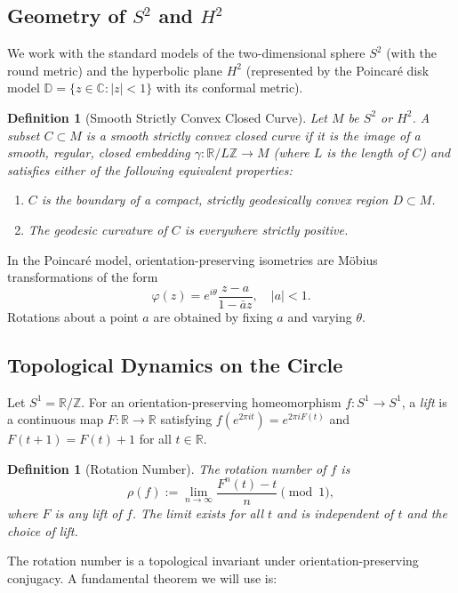 \documentclass{article}
\newtheorem{definition}[theorem]{Definition}
\begin{document}
\subsection{Geometry of $S^2$ and $H^2$}

We work with the standard models of the two-dimensional sphere $S^2$ (with the round metric) and the hyperbolic plane $H^2$ (represented by the Poincaré disk model $\mathbb{D} = \{z \in \mathbb{C}: |z| < 1\}$ with its conformal metric).

\begin{definition}[Smooth Strictly Convex Closed Curve]
    Let $M$ be $S^2$ or $H^2$. A subset $C \subset M$ is a \emph{smooth strictly convex closed curve} if it is the image of a smooth, regular, closed embedding $\gamma: \mathbb{R}/L\mathbb{Z} \to M$ (where $L$ is the length of $C$) and satisfies either of the following equivalent properties:
    \begin{enumerate}
        \item $C$ is the boundary of a compact, strictly geodesically convex region $D \subset M$.
        \item The geodesic curvature of $C$ is everywhere strictly positive.
    \end{enumerate}
\end{definition}
In the Poincaré model, orientation-preserving isometries are Möbius transformations of the form
\[
\varphi(z) = e^{i\theta} \frac{z - a}{1 - \bar{a}z}, \quad |a| < 1.
\]
Rotations about a point $a$ are obtained by fixing $a$ and varying $\theta$.

\subsection{Topological Dynamics on the Circle}

Let $S^1 = \mathbb{R}/\mathbb{Z}$. For an orientation-preserving homeomorphism $f: S^1 \to S^1$, a \emph{lift} is a continuous map $F: \mathbb{R} \to \mathbb{R}$ satisfying $f(e^{2\pi i t}) = e^{2\pi i F(t)}$ and $F(t+1) = F(t) + 1$ for all $t \in \mathbb{R}$.

\begin{definition}[Rotation Number]
    The \emph{rotation number} of $f$ is
    \[
    \rho(f) := \lim_{n\to\infty} \frac{F^n(t) - t}{n} \pmod{1},
    \]
    where $F$ is any lift of $f$. The limit exists for all $t$ and is independent of $t$ and the choice of lift.
\end{definition}

The rotation number is a topological invariant under orientation-preserving conjugacy. A fundamental theorem we will use is:
\end{document}
